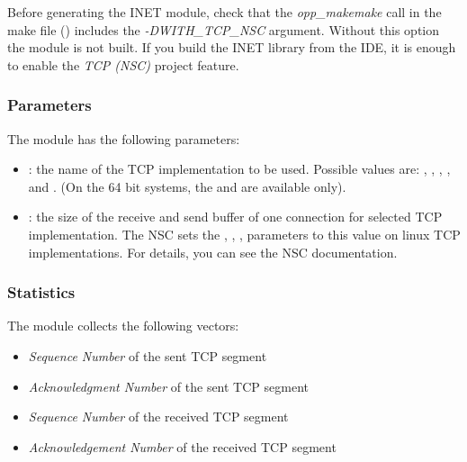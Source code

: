 \begin{warning}
Before generating the INET module, check that the \emph{opp\_makemake} call
in the make file () includes the
\emph{-DWITH\_TCP\_NSC} argument. Without this option the 
module is not built. If you build the INET library from the IDE, it is enough
to enable the \emph{TCP (NSC)} project feature.
\end{warning}

\subsubsection*{Parameters}

The  module has the following parameters:

\begin{itemize}
  \item {}: the name of the TCP implementation to be used.
  Possible values are: , ,
  , ,  and
  . (On the 64 bit systems, the  and
   are available only).

  \item {}: the size of the receive and send buffer of
  one connection for selected TCP implementation.
  The NSC sets the , , , 
  parameters to this value on linux TCP implementations. For details, you can see
  the NSC documentation.
\end{itemize}

\subsubsection*{Statistics}

The  module collects the following vectors:

\begin{itemize}
  \item {} \emph{Sequence Number} of the sent TCP segment
  \item {} \emph{Acknowledgment Number} of the sent TCP segment
  \item {} \emph{Sequence Number} of the received TCP segment
  \item {} \emph{Acknowledgement Number} of the received TCP segment
\end{itemize}

